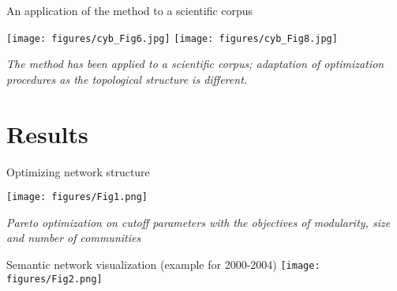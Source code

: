\documentclass{beamer}
\begin{document}
\begin{frame}{An application of the method to a scientific corpus}
	 
	 
	 \texttt{[image: figures/cyb\_Fig6.jpg]}
	 \texttt{[image: figures/cyb\_Fig8.jpg]}
	
	\medskip
	
	\textit{The method has been applied to a scientific corpus; adaptation of optimization procedures as the topological structure is different.} \cite{raimbault2017exploration}
	
		
\end{frame}



\section{Results}
\begin{frame}{Optimizing network structure}
    
    
    
    \centering
    \texttt{[image: figures/Fig1.png]}
    
    \medskip
    
    \textit{Pareto optimization on cutoff parameters with the objectives of modularity, size and number of communities}
    
    \hyperlink{slide:sensitivity}{}
    
\end{frame}

\begin{frame}{Semantic network visualization (example for 2000-2004)}
   \centering
    \texttt{[image: figures/Fig2.png]}
    
\end{frame}
\end{document}
